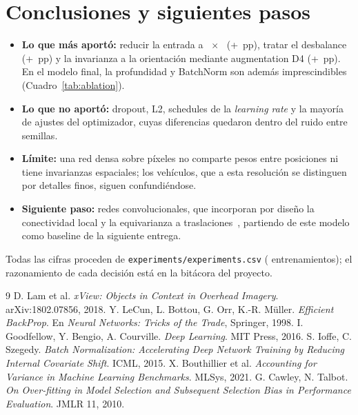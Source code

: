 \section{Conclusiones y siguientes pasos}
\begin{itemize}
  \item \textbf{Lo que más aportó:} reducir la entrada a ~$\times$~
  (+~pp), tratar el desbalance (+~pp) y la invarianza a la orientación
  mediante augmentation D4 (+~pp). En el modelo final, la profundidad y BatchNorm son además
  imprescindibles (Cuadro~\ref{tab:ablation}).
  \item \textbf{Lo que no aportó:} dropout, L2, schedules de la \emph{learning rate} y la mayoría de ajustes del
  optimizador, cuyas diferencias quedaron dentro del ruido entre semillas.
  \item \textbf{Límite:} una red densa sobre píxeles no comparte pesos entre posiciones ni tiene invarianzas
  espaciales; los vehículos, que a esta resolución se distinguen por detalles finos, siguen confundiéndose.
  \item \textbf{Siguiente paso:} redes convolucionales, que incorporan por diseño la conectividad local y la
  equivarianza a traslaciones~\cite{goodfellow}, partiendo de este modelo como baseline de la siguiente entrega.
\end{itemize}

Todas las cifras proceden de \texttt{experiments/experiments.csv} ( entrenamientos); el
razonamiento de cada decisión está en la bitácora del proyecto.

\begin{thebibliography}{9}\small
{} D. Lam et al. \emph{xView: Objects in Context in Overhead Imagery}. arXiv:1802.07856, 2018.
 Y. LeCun, L. Bottou, G. Orr, K.-R. Müller. \emph{Efficient BackProp}. En \emph{Neural Networks: Tricks of the Trade}, Springer, 1998.
 I. Goodfellow, Y. Bengio, A. Courville. \emph{Deep Learning}. MIT Press, 2016.
 S. Ioffe, C. Szegedy. \emph{Batch Normalization: Accelerating Deep Network Training by Reducing Internal Covariate Shift}. ICML, 2015.
 X. Bouthillier et al. \emph{Accounting for Variance in Machine Learning Benchmarks}. MLSys, 2021.
 G. Cawley, N. Talbot. \emph{On Over-fitting in Model Selection and Subsequent Selection Bias in Performance Evaluation}. JMLR 11, 2010.
\end{thebibliography}
